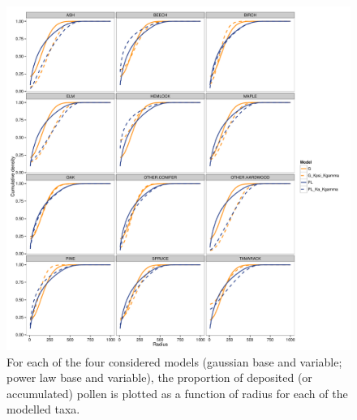 \begin{figure}
\centering
\includegraphics[width=7in]{figures/kernel_discrete_cdfs.pdf}
\caption{For each of the four considered models (gaussian base and
  variable; power law base and variable), the proportion of deposited
  (or accumulated) pollen is plotted as a function of radius for each
  of the modelled taxa.}
\label{fig:dvd}
\end{figure}



